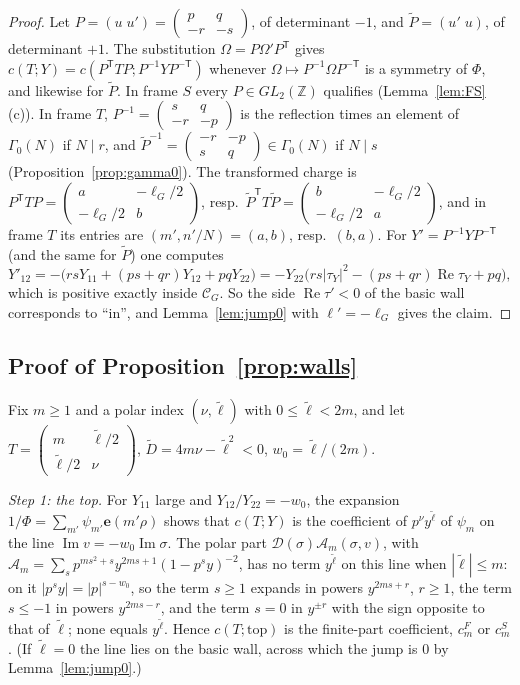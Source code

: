 \documentclass[11pt]{amsart}
\numberwithin{equation}{section}
\theoremstyle{plain}
\theoremstyle{definition}
\theoremstyle{remark}
\newcommand{\Z}{\mathbb{Z}}
\newcommand{\cA}{\mathcal{A}}
\newcommand{\e}{\mathbf{e}}
\newcommand{\sm}[4]{\left(\begin{smallmatrix}#1&#2\\#3&#4\end{smallmatrix}\right)}
\begin{document}
\begin{proof}
Let $P=(u\;u')=\sm pq{-r}{-s}$, of determinant $-1$, and $\tilde P=(u'\;u)$, of determinant $+1$. The substitution $\Omega=P\Omega'P^{\mathsf T}$ gives $c(T;Y)=c(P^{\mathsf T}TP;P^{-1}YP^{-\mathsf T})$ whenever $\Omega\mapsto P^{-1}\Omega P^{-\mathsf T}$ is a symmetry of $\Phi$, and likewise for $\tilde P$. In frame $S$ every $P\in GL_2(\Z)$ qualifies (Lemma~\ref{lem:FS}(c)). In frame $T$, $P^{-1}=\sm sq{-r}{-p}$ is the reflection times an element of $\Gamma_0(N)$ if $N\mid r$, and $\tilde P^{-1}=\sm{-r}{-p}sq\in\Gamma_0(N)$ if $N\mid s$ (Proposition~\ref{prop:gamma0}). The transformed charge is $P^{\mathsf T}TP=\sm a{-\ell_G/2}{-\ell_G/2}b$, resp.\ $\tilde P^{\mathsf T}T\tilde P=\sm b{-\ell_G/2}{-\ell_G/2}a$, and in frame $T$ its entries are $(m',n'/N)=(a,b)$, resp.\ $(b,a)$. For $Y'=P^{-1}YP^{-\mathsf T}$ (and the same for $\tilde P$) one computes
\[
Y'_{12}=-\bigl(rsY_{11}+(ps+qr)Y_{12}+pqY_{22}\bigr)=-Y_{22}\bigl(rs|\tau_Y|^2-(ps+qr)\operatorname{Re}\tau_Y+pq\bigr),
\]
which is positive exactly inside $\mathcal C_G$. So the side $\operatorname{Re}\tau'<0$ of the basic wall corresponds to ``in'', and Lemma~\ref{lem:jump0} with $\ell'=-\ell_G$ gives the claim.
\end{proof}

\subsection{Proof of Proposition~\ref{prop:walls}}
Fix $m\ge1$ and a polar index $(\nu,\tilde\ell)$ with $0\le\tilde\ell<2m$, and let $T=\sm m{\tilde\ell/2}{\tilde\ell/2}\nu$, $\tilde D=4m\nu-\tilde\ell^2<0$, $w_0=\tilde\ell/(2m)$.

\emph{Step 1: the top.} For $Y_{11}$ large and $Y_{12}/Y_{22}=-w_0$, the expansion $1/\Phi=\sum_{m'}\psi_{m'}\e(m'\rho)$ shows that $c(T;Y)$ is the coefficient of $p^{\nu}y^{\tilde\ell}$ of $\psi_m$ on the line $\operatorname{Im}v=-w_0\operatorname{Im}\sigma$. The polar part $\mathcal D(\sigma)\cA_m(\sigma,v)$, with $\cA_m=\sum_sp^{ms^2+s}y^{2ms+1}(1-p^sy)^{-2}$, has no term $y^{\tilde\ell}$ on this line when $|\tilde\ell|\le m$: on it $|p^sy|=|p|^{s-w_0}$, so the term $s\ge1$ expands in powers $y^{2ms+r}$, $r\ge1$, the term $s\le-1$ in powers $y^{2ms-r}$, and the term $s=0$ in $y^{\pm r}$ with the sign opposite to that of $\tilde\ell$; none equals $y^{\tilde\ell}$. Hence $c(T;\text{top})$ is the finite-part coefficient, $c^F_m$ or $c^S_m$. (If $\tilde\ell=0$ the line lies on the basic wall, across which the jump is $0$ by Lemma~\ref{lem:jump0}.)
\end{document}
